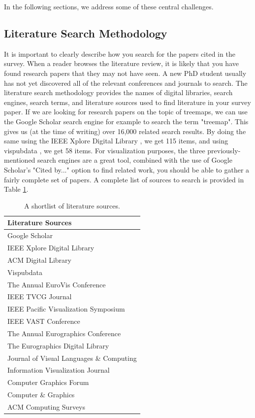 In the following sections, we address some of these central challenges.

\subsection{Literature Search Methodology \cons} \label{sec:search}
It is important to clearly describe how you search for the papers cited in the survey. When a reader browses the literature review, it is likely that you have found research papers that they may not have seen. A new PhD student usually has not yet discovered all of the relevant conferences and journals to search. The literature search methodology provides the names of digital libraries, search engines, search terms, and literature sources used to find literature in your survey paper. 
If we are looking for research papers on the topic of treemaps, we can use the Google Scholar search engine for example \cite{scholar} to search the term "treemap". This gives us (at the time of writing) over 16,000 related search results. By doing the same using the IEEE Xplore Digital Library \cite{ieeexplore}, we get 115 items, and using vispubdata \cite{isenberg2017VPD}, we get 58 items. For visualization purposes, the three previously-mentioned search engines are a great tool, combined with the use of Google Scholar's "Cited by..." option to find related work, you should be able to gather a fairly complete set of papers. A complete list of sources to search is provided in Table \ref{table:searchTable}.

\begin{table}[t]
\footnotesize
\centering
{}
\begin{tabularx}{0.6\textwidth}{|X|}
\hline \rowcolor{black!30}
Literature Sources \\ \hline
Google Scholar  \cite{scholar}\\
IEEE Xplore Digital Library \cite{ieeexplore}\\
ACM Digital Library \\
Vispubdata \cite{isenberg2017VPD}\\
The Annual EuroVis Conference   \\
IEEE TVCG Journal  \\
IEEE Pacific Visualization Symposium  \\
IEEE VAST Conference  \\
The Annual Eurographics Conference  \\
The Eurographics Digital Library \\
Journal of Visual Languages \& Computing  \\
Information Visualization Journal  \\
Computer Graphics Forum  \\
Computer \& Graphics \\
ACM Computing Surveys  \\ 
\hline
\end{tabularx}
\caption{A shortlist of literature sources.} \label{table:searchTable}
\end{table} 

